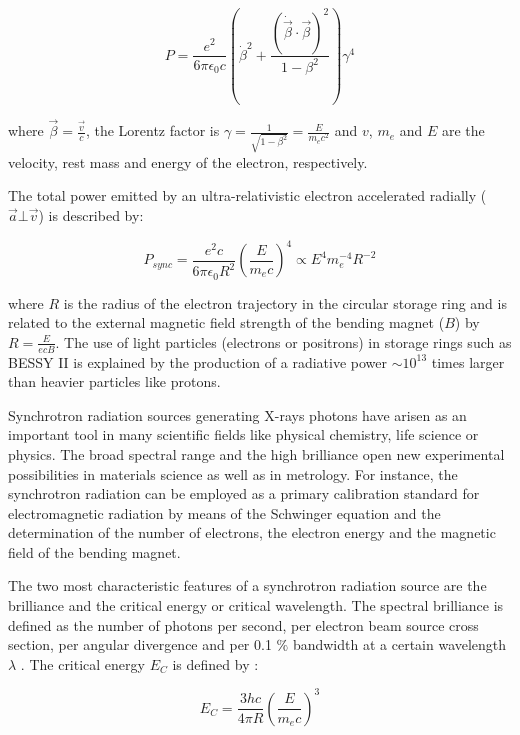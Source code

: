 \begin{equation}
        P=\frac{e^2}{6\pi\epsilon_0c}\left( \dot{\beta}^2 + \frac{(\dot{\vec{\beta}} \cdot \vec{\beta})^2}{1-\beta^2} \right) \gamma^4
\end{equation}

where $\vec{\beta}=\frac{\vec{v}}{c}$, the Lorentz factor is $\gamma=\frac{1}{\sqrt{1-\beta^2}}=\frac{E}{m_e c^2}$ and $v$, $m_e$ and $E$ are the velocity, rest mass and energy of the electron, respectively.

The total power emitted by an ultra-relativistic electron accelerated radially ($\vec{a} \bot \vec{v}$) is described by:

\begin{equation}
        P_{sync}=\frac{e^2 c}{6\pi\epsilon_0 R^2}\left(\frac{E}{m_e c}\right)^4 \propto E^4 m_e^{-4} R^{-2}
\end{equation}

where $R$ is the radius of the electron trajectory in the circular storage ring and is related to the external magnetic field strength of the bending magnet ($B$) by $R=\frac{E}{ecB}$. The use of light particles (electrons or positrons) in storage rings such as BESSY II is explained by the production of a radiative power $\sim 10^{13}$ times larger than heavier particles like protons.

Synchrotron radiation sources generating X-rays photons have arisen as an important tool in many scientific fields like physical chemistry, life science or physics. The broad spectral range and the high brilliance open new experimental possibilities in materials science as well as in metrology. For instance, the synchrotron radiation can be employed as a primary calibration standard for electromagnetic radiation \citep{thornagel_electron_2001} by means of the Schwinger equation \citep{schwinger_classical_1949} and the determination of the number of electrons, the electron energy and the magnetic field of the bending magnet.

The two most characteristic features of a synchrotron radiation source are the brilliance and the critical energy or critical wavelength. The spectral brilliance is defined as the number of photons per second, per electron beam source cross section, per angular divergence and per 0.1 $\%$ bandwidth at a certain wavelength $\lambda$ \citep{baumgartel_e.-e._1984}. The critical energy $E_C$ is defined by \citep{schwinger_classical_1949}:

\begin{equation}
        E_C=\frac{3hc}{4\pi R}\left(\frac{E}{m_e c}\right)^3
\end{equation}

